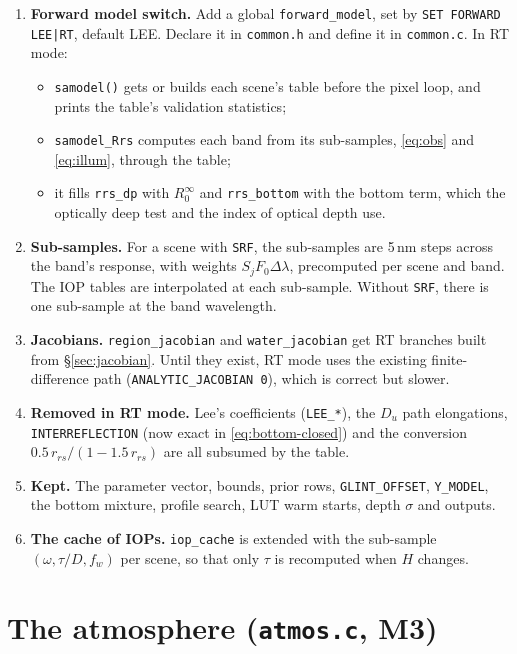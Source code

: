 \documentclass[11pt]{article}
\numberwithin{equation}{section}
\newcommand{\code}[1]{\texttt{#1}}
\begin{document}
\begin{enumerate}
\item \textbf{Forward model switch.} Add a global \code{forward\_model}, set by \code{SET
FORWARD LEE|RT}, default LEE. Declare it in \code{common.h} and define it in \code{common.c}.
In RT mode:
\begin{itemize}
\item \code{samodel()} gets or builds each scene's table before the pixel loop, and prints
the table's validation statistics;
\item \code{samodel\_Rrs} computes each band from its sub-samples, \eqref{eq:obs} and
\eqref{eq:illum}, through the table;
\item it fills \code{rrs\_dp} with $R_0^{\infty}$ and \code{rrs\_bottom} with the bottom term,
which the optically deep test and the index of optical depth use.
\end{itemize}
\item \textbf{Sub-samples.} For a scene with \code{SRF}, the sub-samples are 5\,nm steps across
the band's response, with weights $S_jF_0\Delta\lambda$, precomputed per scene and band. The
IOP tables are interpolated at each sub-sample. Without \code{SRF}, there is one sub-sample at
the band wavelength.
\item \textbf{Jacobians.} \code{region\_jacobian} and \code{water\_jacobian} get RT branches built
from \S\ref{sec:jacobian}. Until they exist, RT mode uses the existing finite-difference path
(\code{ANALYTIC\_JACOBIAN 0}), which is correct but slower.
\item \textbf{Removed in RT mode.} Lee's coefficients (\code{LEE\_*}), the $D_u$ path elongations,
\code{INTERREFLECTION} (now exact in \eqref{eq:bottom-closed}) and the conversion
$0.5\,r_{rs}/(1-1.5\,r_{rs})$ are all subsumed by the table.
\item \textbf{Kept.} The parameter vector, bounds, prior rows, \code{GLINT\_OFFSET},
\code{Y\_MODEL}, the bottom mixture, profile search, LUT warm starts, depth $\sigma$ and
outputs.
\item \textbf{The cache of IOPs.} \code{iop\_cache} is extended with the sub-sample $(\omega, \tau/D,
f_w)$ per scene, so that only $\tau$ is recomputed when $H$ changes.
\end{enumerate}

\section{The atmosphere (\code{atmos.c}, M3)}\label{sec:atmos}
\end{document}
